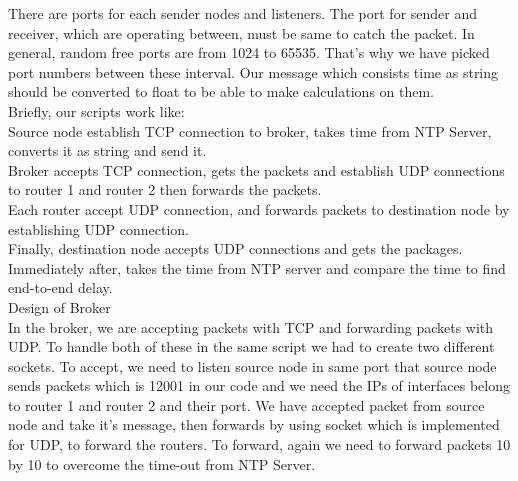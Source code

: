 There are ports for each sender nodes and listeners. The port for sender and receiver, which are operating between, must be same to catch the packet. In general, random free ports are from 1024 to 65535. That's why we have picked port numbers between these interval.
Our message which consists time as string should be converted to float to be able to make calculations on them.\\
Briefly, our scripts work like:\\
Source node establish TCP connection to broker, takes time from NTP Server, converts it as string and send it.\\
Broker accepts TCP connection, gets the packets and establish UDP connections to router 1 and router 2 then forwards the packets.\\
Each router accept UDP connection, and forwards packets to destination node by establishing UDP connection.\\
Finally, destination node accepts UDP connections and gets the packages. Immediately after, takes the time from NTP server and compare the time to find end-to-end delay.\\
Design of Broker\\
In the broker, we are accepting packets with TCP and forwarding packets with UDP. To handle both of these in the same script we had to create two different sockets.  To accept, we need to listen source node in same port that source node sends packets which is 12001 in our code and we need the IPs of interfaces belong to router 1 and router 2 and their port. We have accepted packet from source node and take it's message, then forwards by using socket which is implemented for UDP, to forward the routers. To forward, again we need to forward packets 10 by 10 to overcome the time-out from NTP Server.\\